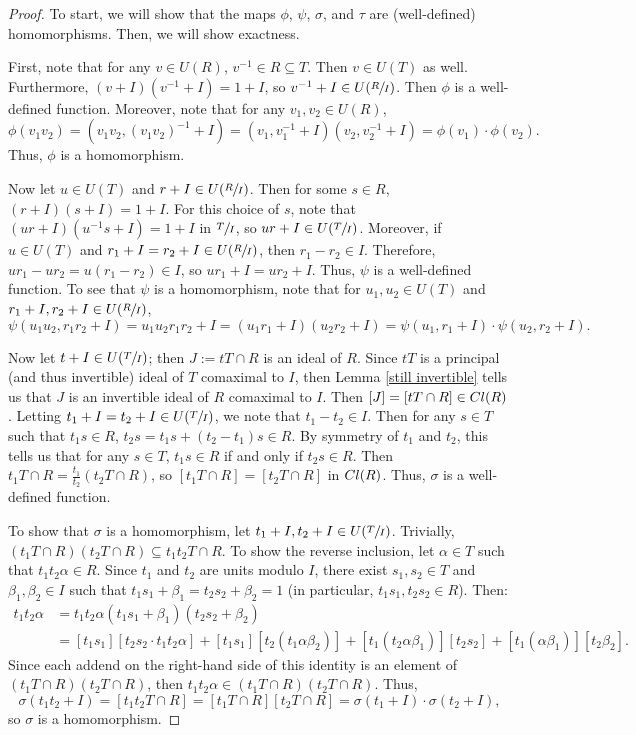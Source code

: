 \documentclass[10pt,a4paper]{amsart}
\newcommand{\Cl}{\textup{Cl}}
\begin{document}
\begin{proof}
    To start, we will show that the maps $\phi$, $\psi$, $\sigma$, and $\tau$ are (well-defined) homomorphisms. Then, we will show exactness.

    First, note that for any $v\in U(R)$, $v^{-1}\in R\subseteq T$. Then $v\in U(T)$ as well. Furthermore, $(v+I)(v^{-1}+I)=1+I$, so $v^{-1}+I\in U(\sfrac{R}{I})$. Then $\phi$ is a well-defined function. Moreover, note that for any $v_1,v_2\in U(R)$,
    $$\phi(v_1v_2)=(v_1v_2,(v_1v_2)^{-1}+I)=(v_1,v_1^{-1}+I)(v_2,v_2^{-1}+I)=\phi(v_1)\cdot \phi(v_2).$$
    Thus, $\phi$ is a homomorphism.

    Now let $u\in U(T)$ and $r+I\in U(\sfrac{R}{I})$. Then for some $s\in R$, $(r+I)(s+I)=1+I$. For this choice of $s$, note that $(ur+I)(u^{-1}s+I)=1+I$ in $\sfrac{T}{I}$, so $ur+I\in U(\sfrac{T}{I})$. Moreover, if $u\in U(T)$ and $r_1+I=r_2+I\in U(\sfrac{R}{I})$, then $r_1-r_2\in I$. Therefore, $ur_1-ur_2=u(r_1-r_2)\in I$, so $ur_1+I=ur_2+I$. Thus, $\psi$ is a well-defined function. To see that $\psi$ is a homomorphism, note that for $u_1,u_2\in U(T)$ and $r_1+I,r_2+I\in U(\sfrac{R}{I})$,
    $$\psi(u_1u_2,r_1r_2+I)=u_1u_2r_1r_2+I=(u_1r_1+I)(u_2r_2+I)=\psi(u_1,r_1+I)\cdot\psi(u_2,r_2+I).$$

    Now let $t+I\in U(\sfrac{T}{I})$; then $J:=tT\cap R$ is an ideal of $R$. Since $tT$ is a principal (and thus invertible) ideal of $T$ comaximal to $I$, then Lemma \ref{still invertible} tells us that $J$ is an invertible ideal of $R$ comaximal to $I$. Then $[J]=[tT\cap R]\in \Cl(R)$. Letting $t_1+I=t_2+I\in U(\sfrac{T}{I})$, we note that $t_1-t_2\in I$. Then for any $s\in T$ such that $t_1s\in R$, $t_2s=t_1s+(t_2-t_1)s\in R$. By symmetry of $t_1$ and $t_2$, this tells us that for any $s\in T$, $t_1s\in R$ if and only if $t_2s\in R$. Then $t_1T\cap R=\frac{t_1}{t_2}(t_2T\cap R)$, so $[t_1T\cap R]=[t_2T\cap R]$ in $\Cl(R)$. Thus, $\sigma$ is a well-defined function.

    To show that $\sigma$ is a homomorphism, let $t_1+I,t_2+I\in U(\sfrac{T}{I})$. Trivially, $(t_1T\cap R)(t_2T\cap R)\subseteq t_1t_2T\cap R$. To show the reverse inclusion, let $\alpha\in T$ such that $t_1t_2\alpha\in R$. Since $t_1$ and $t_2$ are units modulo $I$, there exist $s_1,s_2\in T$ and $\beta_1,\beta_2\in I$ such that $t_1s_1+\beta_1=t_2s_2+\beta_2=1$ (in particular, $t_1s_1,t_2s_2\in R$). Then:
    \begin{align*}
        t_1t_2\alpha&=t_1t_2\alpha(t_1s_1+\beta_1)(t_2s_2+\beta_2)\\&=[t_1s_1][t_2s_2\cdot t_1t_2\alpha]+[t_1s_1][t_2(t_1\alpha\beta_2)]+[t_1(t_2\alpha\beta_1)][t_2s_2]+[t_1(\alpha\beta_1)][t_2\beta_2].
    \end{align*}
    Since each addend on the right-hand side of this identity is an element of $(t_1T\cap R)(t_2T\cap R)$, then $t_1t_2\alpha\in (t_1T\cap R)(t_2T\cap R)$. Thus, $$\sigma(t_1t_2+I)=[t_1t_2T\cap R]=[t_1T\cap R][t_2T\cap R]=\sigma(t_1+I)\cdot \sigma(t_2+I),$$
    so $\sigma$ is a homomorphism.


\end{proof}
\end{document}
